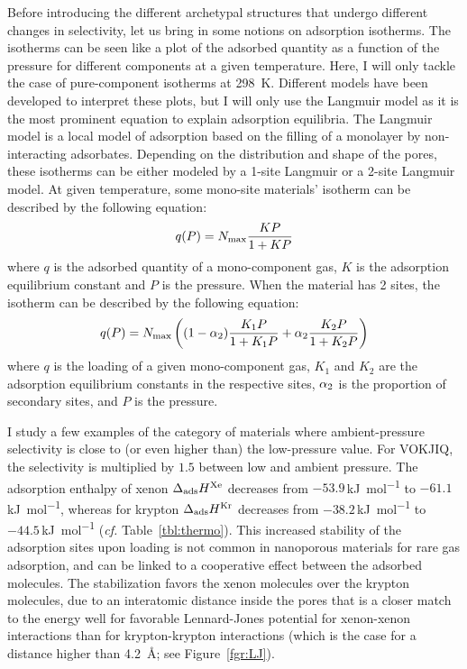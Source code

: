 \documentclass[main.tex]{subfiles}
\begin{document}
Before introducing the different archetypal structures that undergo different changes in selectivity, let us bring in some notions on adsorption isotherms. The isotherms  can be seen  like a plot of the adsorbed quantity as a function of the pressure for different components at a given temperature. Here, I will only tackle the case of pure-component isotherms at \SI{298}{\kelvin}. Different models have been developed to interpret these plots,\autocite{Al_Ghouti_2020} but I will only use the Langmuir model as it is the most prominent equation to explain adsorption equilibria. The Langmuir model is a local model of adsorption based on the filling of a monolayer by non-interacting adsorbates. Depending on the distribution and shape of the pores, these isotherms can be either modeled by a 1-site Langmuir or a 2-site Langmuir model. At given temperature, some mono-site materials' isotherm can be described by the following equation:
\begin{equation}\label{eq:langmuir_1}
    q(P) = N_{\text{max}}\dfrac{KP}{1+KP}
\end{equation}
where $q$ is the adsorbed quantity of a mono-component gas, $K$ is the adsorption equilibrium constant and $P$ is the pressure. When the material has 2 sites, the isotherm can be described by the following equation:
\begin{equation}\label{eq:langmuir_2}
    q(P) = N_{\text{max}}\left((1-\alpha_{\text{2}})\dfrac{K_{\text{1}}P}{1+K_{\text{1}}P}+\alpha_{\text{2}}\dfrac{K_{\text{2}}P}{1+K_{\text{2}}P}\right)
\end{equation}
where $q$ is the loading of a given mono-component gas, $K_1$ and $K_2$ are the adsorption equilibrium constants in the respective sites, $\alpha_{\text{2}}$ is the proportion of secondary sites, and $P$ is the pressure.
  
I study a few examples of the category of materials where ambient-pressure selectivity is close to (or even higher than) the low-pressure value. For VOKJIQ, the selectivity is multiplied by $1.5$ between low and ambient pressure. The adsorption enthalpy of xenon $\Delta_{\text{ads}}H^{\text{Xe}}$ decreases from $-53.9$\,\si{\kilo\joule\per\mol} to $-61.1$\,\si{\kilo\joule\per\mol}, whereas for krypton $\Delta_{\text{ads}}H^{\text{Kr}}$ decreases from $-38.2$\,\si{\kilo\joule\per\mol} to $-44.5$\,\si{\kilo\joule\per\mol} (\emph{cf.} Table~\ref{tbl:thermo}). This increased stability of the adsorption sites upon loading is not common in nanoporous materials for rare gas adsorption, and can be linked to a cooperative effect between the adsorbed molecules. The stabilization favors the xenon molecules over the krypton molecules, due to an interatomic distance inside the pores that is a closer match to the energy well for favorable Lennard-Jones potential for xenon-xenon interactions than for krypton-krypton interactions (which is the case for a distance higher than \SI{4.2}{\angstrom}; see Figure~\ref{fgr:LJ}).
\end{document}
